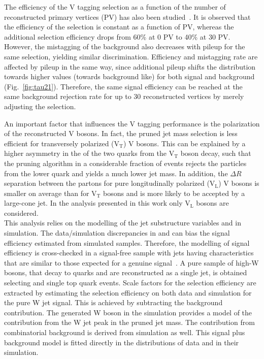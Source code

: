 The efficiency of the V tagging selection as a function of the number of reconstructed primary vertices (PV) has also been studied~\cite{JME-16-003}. It is observed that the efficiency of the \mJ selection is constant as a function of PV, whereas the additional \nsubj selection efficiency drops from 60\% at 0 PV to 40\% at 30 PV. However, the mistagging of the background also decreases with pileup for the same selection, yielding similar discrimination. Efficiency and mistagging rate are affected by pileup in the same way, since additional pileup shifts the \nsubj distribution towards higher values (towards background like) for both signal and background (Fig.~\ref{fig:tau21}). Therefore, the same signal efficiency can be reached at the same background rejection rate for up to 30 reconstructed vertices by merely adjusting the \nsubj selection.

An important factor that influences the V tagging performance is the polarization of the reconstructed V bosons. In fact, the pruned jet mass selection is less efficient for transversely polarized (V$_\mathrm{T}$) V bosons. This can be explained by a higher asymmetry in the \pt of the two quarks from the V$_\mathrm{T}$ boson decay, such that the pruning algorithm in a considerable fraction of events rejects the particles from the lower \pt quark and yields a much lower jet mass. In addition, the $\Delta R$ separation between the partons for pure longitudinally polarized (V$_\mathrm{L}$) V bosons is smaller on average than for V$_\mathrm{T}$ bosons and is more likely to be accepted by a large-cone jet. In the analysis presented in this work only V$_\mathrm{L}$  bosons are considered.\\

This analysis relies on the modelling of the jet substructure variables \mJ and \nsubj in simulation. The data/simulation discrepancies in \mJ and \nsubj can bias the signal efficiency estimated from simulated samples. Therefore, the modelling of signal efficiency is cross-checked in a signal-free sample with jets having characteristics that are similar to those expected for a genuine signal~\cite{JME-16-003}. A pure sample of high-\pt W bosons, that decay to quarks and are reconstructed as a single jet, is obtained selecting \ttbar and single top quark events.
Scale factors for the \nsubj selection efficiency are extracted by estimating the selection efficiency on both data and simulation for the pure W jet signal. This is achieved by subtracting the background contribution.
The generated W boson in the \ttbar simulation provides a model of the contribution from the W jet peak in the pruned jet mass. The contribution from combinatorial background is derived from \ttbar simulation as well. This signal plus background model is fitted directly in the distributions of data and in their simulation.

